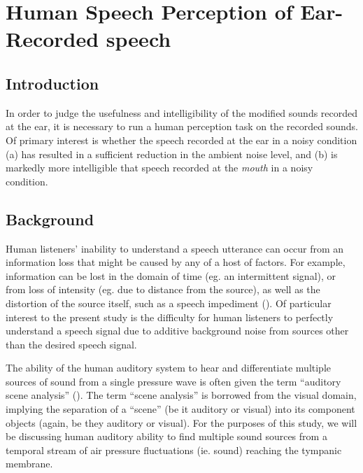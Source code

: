 \documentclass[dissertation,copyright]{uathesis}
\begin{document}


 



\chapter{Human Speech Perception of Ear-Recorded speech\label{chapter4}}


\section{Introduction}

In order to judge the usefulness and intelligibility of the modified sounds recorded at the ear, it is necessary to run a human perception task on the recorded sounds.  Of primary interest is whether the speech recorded at the ear in a noisy condition (a) has resulted in a sufficient reduction in the ambient noise level, and (b) is markedly more intelligible that speech recorded at the \textit{mouth} in a noisy condition.

\section{Background}\label{chap2:background}

Human listeners' inability to understand a speech utterance can occur from an information loss that might be caused by any of a host of factors.  For example, information can be lost in the domain of time (eg. an intermittent signal), or from loss of intensity (eg. due to distance from the source), as well as the distortion of the source itself, such as a speech impediment (\cite{mattys:12}).  Of particular interest to the present study is the difficulty for human listeners to perfectly understand a speech signal due to additive background noise from sources other than the desired speech signal.

The ability of the human auditory system to hear and differentiate multiple sources of sound from a single pressure wave is often given the term ``auditory scene analysis'' (\cite{bregman:94}).  The term ``scene analysis'' is borrowed from the visual domain, implying the separation of a ``scene'' (be it auditory or visual) into its component objects (again, be they auditory or visual). For the purposes of this study, we will be discussing human auditory ability to find multiple sound sources from a temporal stream of air pressure fluctuations (ie. sound) reaching the tympanic membrane.
\end{document}
